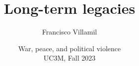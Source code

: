\documentclass[aspectratio=43]{beamer}
\title{\huge Long-term legacies}
\author{Francisco Villamil}
\date{War, peace, and political violence\\UC3M, Fall 2023}
\begin{document}
\begin{frame}
  \titlepage
\end{frame}
\end{document}
